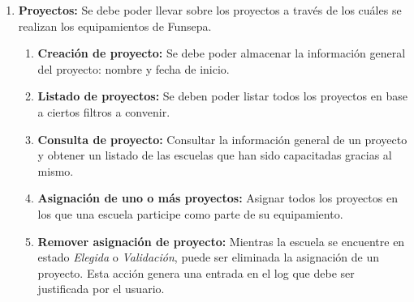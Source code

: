 \documentclass[11pt]{report}
\newcommand{\requisito}[2]{\textbf{#1:} #2}
\begin{document}
\begin{enumerate}[leftmargin=0.8cm]
		\item \requisito{Proyectos}{Se debe poder llevar sobre los proyectos a través de los cuáles se realizan los equipamientos de Funsepa.}
		\begin{enumerate}
			\item \requisito{Creación de proyecto}{Se debe poder almacenar la información general del proyecto: nombre y fecha de inicio.}
			\item \requisito{Listado de proyectos}{Se deben poder listar todos los proyectos en base a ciertos filtros a convenir.}
			\item \requisito{Consulta de proyecto}{Consultar la información general de un proyecto y obtener un listado de las escuelas que han sido capacitadas gracias al mismo.}
			\item \requisito{Asignación de uno o más proyectos}{Asignar todos los proyectos en los que una escuela participe como parte de su equipamiento.}
			\item \requisito{Remover asignación de proyecto}{Mientras la escuela se encuentre en estado \textit{Elegida} o \textit{Validación}, puede ser eliminada la asignación de un proyecto. Esta acción genera una entrada en el log que debe ser justificada por el usuario.}
		\end{enumerate}
		

\end{enumerate}
\end{document}
